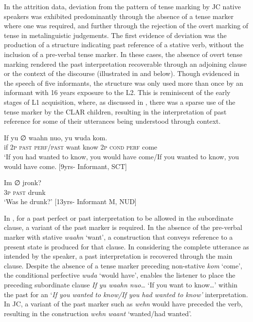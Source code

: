 \documentclass[output=paper,colorlinks,citecolor=brown]{langscibook}
\begin{document}
In the attrition data, deviation from the pattern of tense marking by JC native speakers was exhibited predominantly through the absence of a tense marker where one was required, and further through the rejection of the overt marking of tense in metalinguistic judgements. The first evidence of deviation was the production of a structure indicating past reference of a stative verb, without the inclusion of a pre-verbal tense marker. In these cases, the absence of overt tense marking rendered the past interpretation recoverable through an adjoining clause or the context of the discourse (illustrated in  and  below). Though evidenced in the speech of five informants, the structure was only used more than once by an informant with 16 years exposure to the L2. This is reminiscent of the early stages of L1 acquisition, where, as discussed in , there was a sparse use of the tense marker by the CLAR children, resulting in the interpretation of past reference for some of their utterances being understood through context.

\ea \label{bkm:messamK:16}
\gll  If yu ∅  waahn  nuo,   yu wuda           kom.\\
if 2\textsc{p}  \textsc{past} \textsc{perf/past} want      know 2\textsc{p}  \textsc{cond} \textsc{perf} come\\
\glt `If you had wanted to know, you would have come\slash If you wanted to know, you     would have come.                           [9yrs- Informant, SCT]
\z



\ea \label{bkm:messamK:17}
\gll  Im ∅        jronk? \\
3\textsc{p}  \textsc{past}  drunk\\
\glt `Was he drunk?’                   [13yrs- Informant M, NUD]
\z




In , for a past perfect or past interpretation to be allowed in the subordinate clause, a variant of the past marker is required. In the absence of the pre-verbal marker with stative \textit{waahn} ‘want’, a construction that conveys reference to a present state is produced for that clause. In considering the complete utterance as intended by the speaker, a past interpretation is recovered through the main clause. Despite the absence of a tense marker preceding non-stative \textit{kom}  ‘come’, the conditional perfective \textit{wuda} ‘would have’, enables the listener to place the preceding subordinate clause \textit{If yu waahn nuo…} ‘If you want to know…’ within the past for an ‘\textit{If you wanted to know/If you had wanted to know’} interpretation. In JC, a variant of the past marker such as \textit{wehn} would have preceded the verb, resulting in the construction \textit{wehn waant} ‘wanted/had wanted’.
\end{document}
